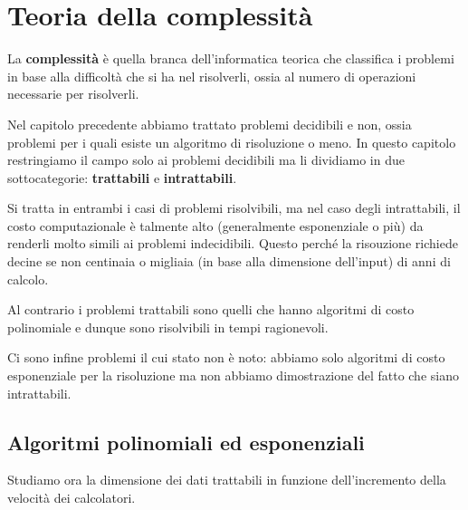 \chapter{Teoria della complessit\`a}
La \textbf{complessit\`a} \`e quella branca dell'informatica teorica che classifica i problemi in base alla
difficolt\`a che si ha nel risolverli, ossia al numero di operazioni necessarie per risolverli.

Nel capitolo precedente abbiamo trattato problemi decidibili e non, ossia problemi per i quali esiste un algoritmo
di risoluzione o meno. In questo capitolo restringiamo il campo solo ai problemi decidibili ma li dividiamo in due
sottocategorie: \textbf{trattabili} e \textbf{intrattabili}.

Si tratta in entrambi i casi di problemi risolvibili, ma nel caso degli intrattabili, il costo computazionale \`e
talmente alto (generalmente esponenziale o pi\`u) da renderli molto simili ai problemi indecidibili. Questo perch\'e
la risouzione richiede decine se non centinaia o migliaia (in base alla dimensione dell'input) di anni di calcolo.

Al contrario i problemi trattabili sono quelli che hanno algoritmi di costo polinomiale e dunque sono risolvibili in
tempi ragionevoli.

Ci sono infine problemi il cui stato non \`e noto: abbiamo solo algoritmi di costo esponenziale per la risoluzione ma
non abbiamo dimostrazione del fatto che siano intrattabili.

\section{Algoritmi polinomiali ed esponenziali}
Studiamo ora la dimensione dei dati trattabili in funzione dell'incremento della velocit\`a dei calcolatori.

